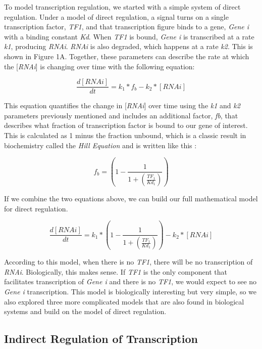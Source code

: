 \documentclass{article}
\begin{document}
To model transcription regulation, we started with a simple system of direct regulation. Under a model of direct regulation, a signal turns on a single transcription factor, \textit{TF1}, and that transcription figure binds to a gene, \textit{Gene i} with a binding constant \textit{Kd}. When \textit{TF1} is bound, \textit{Gene i} is transcribed at a rate \textit{k1}, producing \textit{RNAi}. \textit{RNAi} is also degraded, which happens at a rate \textit{k2}. This is shown in Figure 1A. Together, these parameters can describe the rate at which the [\textit{RNAi}] is changing over time with the following equation:

\[
\frac{d[RNAi]}{dt} = k_1 * f_b - k_2 * [RNAi]
\]

This equation quantifies the change in [\textit{RNAi}] over time using the \textit{k1} and \textit{k2} parameters previously mentioned and includes an additional factor, \textit{fb}, that describes what fraction of transcription factor is bound to our gene of interest. This is calculated as 1 minus the fraction unbound, which is a classic result in biochemistry called the \textit{Hill Equation} and is written like this \cite{Hill2008}:

\[
f_b = \left(1 - \frac{1}{1 + \left(\frac{TF_1}{Kd_1}\right)}\right)
\]

If we combine the two equations above, we can build our full mathematical model for direct regulation. 

\[
\frac{d[RNAi]}{dt} = k_1 * \left(1 - \frac{1}{1 + \left(\frac{TF_1}{Kd_1}\right)}\right) - k_2 * [RNAi]
\]

According to this model, when there is no \textit{TF1}, there will be no transcription of \textit{RNAi}. Biologically, this makes sense. If \textit{TF1} is the only component that facilitates transcription of \textit{Gene i} and there is no \textit{TF1}, we would expect to see no \textit{Gene i} transcription. This model is biologically interesting but very simple, so we also explored three more complicated models that are also found in biological systems and build on the model of direct regulation. 

\subsection{Indirect Regulation of Transcription}
\end{document}
